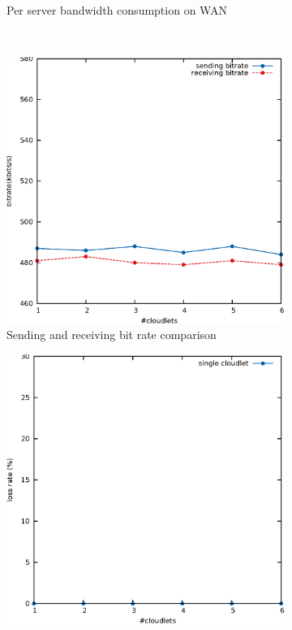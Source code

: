 \documentclass[letterpaper,twocolumn,10pt]{article}
\begin{document}
\begin{figure}[t]
\begin{subfigure}[t]{0.3\textwidth}
                \caption{Per server bandwidth consumption on WAN}
                \label{fig:sinPerServerBand}
        \end{subfigure}
        ~ %
        \begin{subfigure}[t]{0.3\textwidth}
                \includegraphics[width=\textwidth]{pic/sendingVsReceiving.eps}
                \caption{Sending and receiving bit rate comparison}
                \label{fig:sinBitRateComp}
        \end{subfigure}
        \begin{subfigure}[t]{0.3\textwidth}
                \includegraphics[width=\textwidth]{pic/lossrate.eps}

\end{subfigure}
\end{figure}
\end{document}
